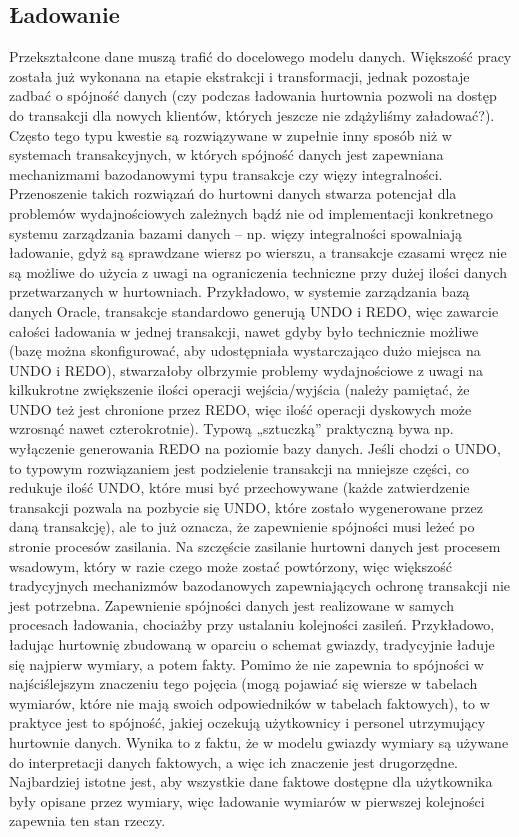 \subsection{Ładowanie}
Przekształcone dane muszą trafić do docelowego modelu danych.
Większość pracy została już wykonana na etapie ekstrakcji i transformacji,
 jednak pozostaje zadbać o spójność danych 
 (czy podczas ładowania hurtownia pozwoli na dostęp do transakcji dla nowych klientów,
 których jeszcze nie zdążyliśmy załadować?).
Często tego typu kwestie są rozwiązywane w zupełnie inny sposób niż w systemach transakcyjnych,
 w których spójność danych jest zapewniana mechanizmami bazodanowymi typu transakcje czy więzy integralności.
Przenoszenie takich rozwiązań do hurtowni danych stwarza potencjał dla problemów wydajnościowych zależnych bądź nie od implementacji
 konkretnego systemu zarządzania bazami danych – np. więzy integralności spowalniają ładowanie,
 gdyż są sprawdzane wiersz po wierszu,
 a transakcje czasami wręcz nie są możliwe do użycia 
 z uwagi na ograniczenia techniczne przy dużej ilości danych przetwarzanych w hurtowniach. 
Przykładowo, w systemie zarządzania bazą danych Oracle,
 transakcje standardowo generują UNDO i REDO,
 więc zawarcie całości ładowania w jednej transakcji,
 nawet gdyby było technicznie możliwe 
 (bazę można skonfigurować, aby udostępniała wystarczająco dużo miejsca na UNDO i REDO), 
 stwarzałoby olbrzymie problemy wydajnościowe z uwagi na kilkukrotne zwiększenie ilości operacji wejścia/wyjścia 
 (należy pamiętać, że UNDO też jest chronione przez REDO,
 więc ilość operacji dyskowych może wzrosnąć nawet czterokrotnie). 
Typową „sztuczką” praktyczną bywa np. wyłączenie generowania REDO na poziomie bazy danych. 
Jeśli chodzi o UNDO,
 to typowym rozwiązaniem jest podzielenie transakcji na mniejsze części,
 co redukuje ilość UNDO, które musi być przechowywane 
 (każde zatwierdzenie transakcji pozwala na pozbycie się UNDO,
 które zostało wygenerowane przez daną transakcję), 
 ale to już oznacza,
 że zapewnienie spójności musi leżeć po stronie procesów zasilania. 
Na szczęście zasilanie hurtowni danych jest procesem wsadowym, który w razie czego może zostać powtórzony,
 więc większość tradycyjnych mechanizmów bazodanowych zapewniających ochronę transakcji nie jest potrzebna. 
Zapewnienie spójności danych jest realizowane w samych procesach ładowania, 
 chociażby przy ustalaniu kolejności zasileń.
Przykładowo, ładując hurtownię zbudowaną w oparciu o schemat gwiazdy, 
 tradycyjnie ładuje się najpierw wymiary, 
 a potem fakty. Pomimo że nie zapewnia to spójności w najściślejszym znaczeniu tego pojęcia 
 (mogą pojawiać się wiersze w tabelach wymiarów, które nie mają swoich odpowiedników w tabelach faktowych), 
 to w praktyce jest to spójność, jakiej oczekują użytkownicy i personel utrzymujący hurtownie danych.
Wynika to z faktu, że w modelu gwiazdy wymiary są używane do interpretacji danych faktowych, a więc ich znaczenie jest drugorzędne. 
Najbardziej istotne jest, aby wszystkie dane faktowe dostępne dla użytkownika były opisane przez wymiary, 
więc ładowanie wymiarów w pierwszej kolejności zapewnia ten stan rzeczy. 


